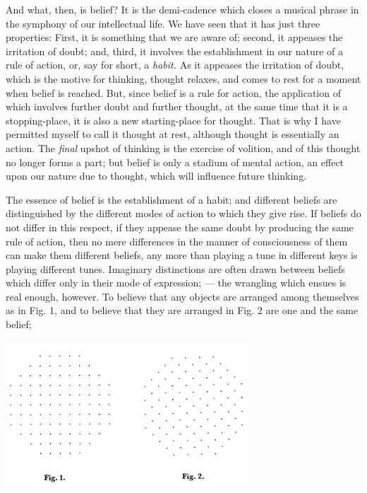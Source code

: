 And what, then, is belief? It is the demi-cadence which closes a musical phrase in the symphony of our intellectual life. We have seen that it has just three properties: First, it is something that we are aware of; second, it appeases the irritation of doubt; and, third, it involves the establishment in our nature of a rule of action, or, say for short, a \emph{habit.} As it appeases the irritation of doubt, which is the motive for thinking, thought relaxes, and comes to rest for a moment when belief is reached. But, since belief is a rule for action, the application of which involves further doubt and further thought, at the same time that it is a stopping-place, it is also a new starting-place for thought. That is why I have permitted myself to call it thought at rest, although thought is essentially an action. The \emph{final} upshot of thinking is the exercise of volition, and of this thought no longer forms a part; but belief is only a stadium of mental action, an effect upon our nature due to thought, which will influence future thinking.
 

The essence of belief is the establishment of a habit; and different  beliefs are distinguished by the different modes of action to which they give rise. If beliefs do not differ in this respect, if they appease the same doubt by producing the same rule of action, then no mere differences in the manner of consciousness of them can make them different beliefs, any more than playing a tune in different keys is playing different tunes. Imaginary distinctions are often drawn between beliefs which differ only in their mode of expression; --- the wrangling which ensues is real enough, however. To believe that any objects are arranged among themselves as in Fig. 1, and to believe that they are arranged in Fig. 2 are one and the same belief;

\includegraphics[width=3.6in]{peirce-howto1.pdf}

